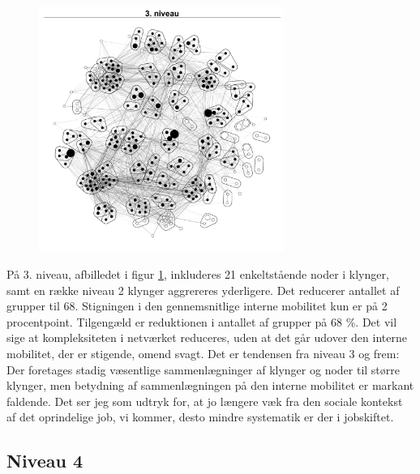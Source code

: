 \begin{figure}
  \vspace{-20pt}
  \begin{center}
   \caption{}
   \label{fig_delanalyse1_kort_seg_proces3}
    \includegraphics[width=8cm]{fig/netvaerkskort/kort_seg_proces3.pdf}
    \label{fig_delanalyse1_kort_seg_proces3}
  \end{center}
  \vspace{-20pt}
\end{figure}

På 3. niveau, afbilledet i figur \ref{fig_delanalyse1_kort_seg_proces3}, inkluderes 21 enkeltstående noder i klynger, samt en række niveau 2 klynger aggrereres yderligere. Det reducerer antallet af grupper til 68. Stigningen i den gennemsnitlige interne mobilitet kun er på 2 procentpoint. Tilgengæld er reduktionen i antallet af grupper på 68 \%. Det vil sige at kompleksiteten i netværket reduceres, uden at det går udover den interne mobilitet, der er stigende, omend svagt. Det er tendensen fra niveau 3 og frem: Der foretages stadig væsentlige sammenlægninger af klynger og noder til større klynger, men betydning af sammenlægningen på den interne mobilitet er markant faldende. Det ser jeg som udtryk for, at jo længere væk fra den sociale kontekst af det oprindelige job, vi kommer, desto mindre systematik er der i jobskiftet.


\newpage \subsection{Niveau 4}

